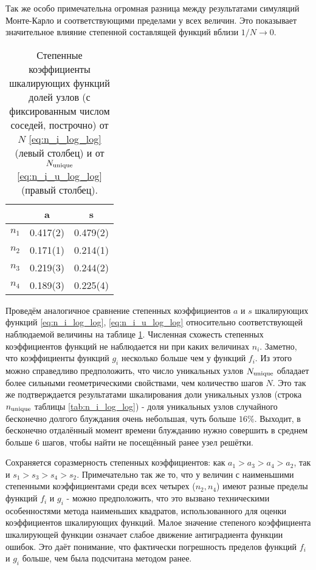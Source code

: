 Так же особо примечательна огромная разница между результатами симуляций Монте-Карло и соответствующими пределами у всех величин.
Это показывает значительное влияние степенной составлящей функций вблизи $1/N \to 0$.

\begin{table}[h]
\centering
\begin{tabular}{|c|c|c|}
\hline
 & a & s \\ \hline
$n_1$ & 0.417(2) & 0.479(2) \\ \hline
$n_2$ & 0.171(1) & 0.214(1) \\ \hline
$n_3$ & 0.219(3) & 0.244(2) \\ \hline
$n_4$ & 0.189(3) & 0.225(4) \\ \hline
\end{tabular}
\caption{Степенные коэффициенты шкалирующих функций долей узлов (с фиксированным числом соседей, построчно) от $N$ \eqref{eq:n_i_log_log} (левый столбец) и от $N_{\textup{unique}}$ \eqref{eq:n_i_u_log_log} (правый столбец).}
\label{tab:as_compare}
\end{table}

Проведём аналогичное сравнение степенных коэффициентов $a$ и $s$ шкалирующих функций \eqref{eq:n_i_log_log}, \eqref{eq:n_i_u_log_log} относительно соответствующей наблюдаемой величины на таблице \ref{tab:as_compare}. 
Численная схожесть степенных коэффициентов функций не наблюдается ни при каких величинах $n_i$.
Заметно, что коэффициенты функций $g_i$ несколько больше чем у функций $f_i$.
Из этого можно справедливо предположить, что число уникальных узлов $N_{\textup{unique}}$ обладает более сильными геометрическими свойствами, чем количество шагов $N$. 
Это так же подтверждается результатами шкалирования доли уникальных узлов (строка $n_{\textup{unique}}$ таблицы \ref{tab:n_i_log_log}) - доля уникальных узлов случайного бесконечно долгого блуждания очень небольшая, чуть больше $16\%$.
Выходит, в бесконечно отдалённый момент времени блужданию нужно совершить в среднем больше 6 шагов, чтобы найти не посещённый ранее узел решётки.

Сохраняется соразмерность степенных коэффициентов: как $a_1 > a_3 > a_4 > a_2$, так и $s_1 > s_3 > s_4 > s_2$. 
Примечательно так же то, что у величин с наименьшими степенными коэффициентами среди всех четырех ($n_2, n_4$) имеют разные пределы функций $f_i$ и $g_i$ - можно предположить, что это вызвано техническими особенностями метода наименьших квадратов, использованного для оценки коэффициентов шкалирующих функций.
Малое значение степеного коэффициента шкалирующей функции означает слабое движение антиградиента функции ошибок.
Это даёт понимание, что фактически погрешность пределов функций $f_i$ и $g_i$ больше, чем была подсчитана методом ранее. 


